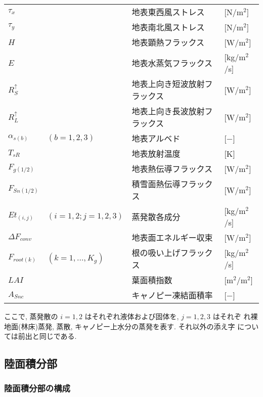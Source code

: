 \begin{tabular}{llll}
$\tau_x$       &                     & 地表東西風ストレス & [N/m$^2$] \\
$\tau_y$       &                     & 地表南北風ストレス & [N/m$^2$] \\
$H$            &                     & 地表顕熱フラックス & [W/m$^2$] \\
$E$            &                     & 地表水蒸気フラックス & [kg/m$^2$/s] \\
$R^{\uparrow}_S$ &                  & 地表上向き短波放射フラックス & [W/m$^2$]\\
$R^{\uparrow}_L$ &                  & 地表上向き長波放射フラックス & [W/m$^2$]\\
$\alpha_{s(b)}$ & $(b=1,2,3)$         & 地表アルベド   & [$-$] \\
$T_{sR}$      &                     & 地表放射温度   & [K]   \\
$F_{g(1/2)}$      &                     & 地表熱伝導フラックス & [W/m$^2$] \\
$F_{Sn(1/2)}$     &                     & 積雪面熱伝導フラックス & [W/m$^2$] \\
$Et_{(i,j)}$   & $(i=1,2;j=1,2,3)$   & 蒸発散各成分   & [kg/m$^2$/s] \\
$\Delta F_{conv}$&                     & 地表面エネルギー収束 & [W/m$^2$] \\
$F_{root(k)}$      & $(k=1,\ldots,K_g)$  & 根の吸い上げフラックス & [kg/m$^2$/s] \\
$LAI$          &                     & 葉面積指数 & [m$^2$/m$^2$] \\
$A_{Snc}$     &                     & キャノピー凍結面積率 & [$-$] \\
\end{tabular}
\medskip

ここで, 蒸発散の $i=1,2$ はそれぞれ液体および固体を, $j=1,2,3$ はそれぞ
れ裸地面(林床)蒸発, 蒸散, キャノピー上水分の蒸発を表す. それ以外の添え字
については前出と同じである. 

\subsection{陸面積分部}

\subsubsection{陸面積分部の構成}

